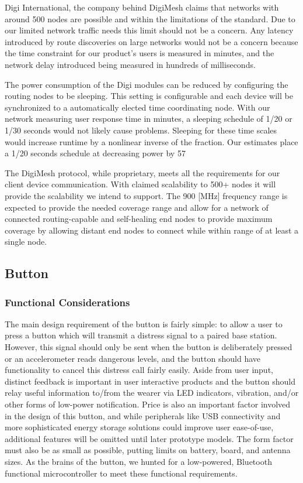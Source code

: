 \documentclass[journal]{IEEEtran}
\begin{document}
Digi International, the company behind DigiMesh claims that networks with around 500 nodes are possible and within the limitations of the standard.  Due to our limited network traffic needs this limit should not be a concern.  Any latency introduced by route discoveries on large networks would not be a concern because the time constraint for our product’s users is measured in minutes, and the network delay introduced being measured in hundreds of milliseconds.

The power consumption of the Digi modules can be reduced by configuring the routing nodes to be sleeping.  This setting is configurable and each device will be synchronized to a automatically elected time coordinating node.  With our network measuring user response time in minutes, a sleeping schedule of 1/20 or 1/30 seconds would not likely cause problems.  Sleeping for these time scales would increase runtime by a nonlinear inverse of the fraction. Our estimates place a 1/20 seconds schedule at decreasing power by 57%

The DigiMesh protocol, while proprietary, meets all the requirements for our client device communication.  With claimed scalability to 500+ nodes it will provide the scalability we intend to support.  The 900 [MHz] frequency range is expected to provide the needed coverage range and allow for a network of connected routing-capable and self-healing end nodes to provide maximum coverage  by allowing distant end nodes to connect while within range of at least a single node.

\subsection{Button}

\subsubsection{Functional Considerations}
The main design requirement of the button is fairly simple: to allow a user to press a button which will transmit a distress signal to a paired base station.  However, this signal should only be sent when the button is deliberately pressed or an accelerometer reads dangerous levels, and the button should have functionality to cancel this distress call fairly easily.  Aside from user input, distinct feedback is important in user interactive products and the button should relay useful information to/from the wearer via LED indicators, vibration, and/or other forms of low-power notification.  Price is also an important factor involved in the design of this button, and while peripherals like USB connectivity and more sophisticated energy storage solutions could improve user ease-of-use, additional features will be omitted until later prototype models.  The form factor must also be as small as possible, putting limits on battery, board, and antenna sizes.  As the brains of the button, we hunted for a low-powered, Bluetooth functional microcontroller to meet these functional requirements.
\end{document}
